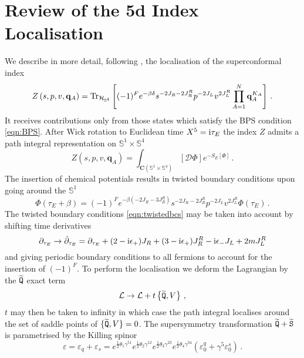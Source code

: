 \documentclass[main.tex]{subfiles}
\begin{document}
\section{Review of the 5d Index Localisation}\label{app:SCIrev}
We describe in more detail, following \cite{Kim:2012gu}, the localisation of the superconformal index
\begin{equation}
Z\left(s,p,v,\mathbf{q}_A\right)=\operatorname{Tr}_{\mathcal{H}_{\mathbb{S}^4}}\left[(-1)^Fe^{-\beta\delta}s^{-2J_R-2J_R^R}p^{-2J_L}v^{2J_L^R}\prod_{A=1}^N\mathbf{q}_A^{K_A}\right]\,.
\end{equation}
It receives contributions only from those states which satisfy the BPS condition \eqref{eqn:BPS}. After Wick rotation to Euclidean time $X^5=\mathrm{i} \tau_E$ the index $Z$ admits a path integral representation on $\mathbb{S}^1\times \mathbb{S}^4$ 
\begin{equation}
Z(s,p,v,\mathbf{q}_A)=\int_{\mathbf{C}(\mathbb{S}^1\times \mathbb{S}^4)}[\mathcal{D}\Phi]e^{-S_{E}[\Phi]}\,.
\end{equation}
The insertion of chemical potentials results in twisted boundary conditions upon going around the $\mathbb{S}^1$
\begin{equation}\label{eqn:twistedbcs}
\Phi(\tau_E+\beta)=(-1)^Fe^{-\beta(-2J_R-3J_R^R)}s^{-2J_R-2J_R^R}p^{-2J_L}v^{2J_L^R}\Phi(\tau_E)\,.
\end{equation}
The twisted boundary conditions \eqref{eqn:twistedbcs} may be taken into account by shifting time derivatives
\begin{equation}\label{eqn:dhat}
\partial_{\tau_E}\to\hat{\partial}_{\tau_E}=\partial_{\tau_E}+(2-\mathrm{i}\epsilon_+)J_R+(3-\mathrm{i}\epsilon_+)J_R^R-\mathrm{i}\epsilon_-J_L+2mJ_L^R
\end{equation}
and giving periodic boundary conditions to all fermions to account for the insertion of $(-1)^F$. 
To perform the localisation we deform the Lagrangian by the $\widetilde{\mathtt{Q}}$ exact term 
\begin{equation}
\mathcal{L}\to\mathcal{L}+t\left\{\widetilde{\mathtt{Q}},V\right\}\,,
\end{equation}
$t$ may then be taken to infinity in which case the path integral localises around the set of saddle points of $\{\widetilde{\mathtt{Q}},V\}=0$. The supersymmetry transformation $\widetilde{\mathtt{Q}}+\widetilde{\mathtt{S}}$ is parametrised by the Killing spinor  
\begin{equation}
\varepsilon=\varepsilon_q+\varepsilon_s=e^{\frac{1}{2}\theta_1\gamma^{51}}e^{\frac{1}{2}\theta_2\gamma^{12}}e^{\frac{1}{2}\theta_3\gamma^{23}}e^{\frac{1}{2}\theta_4\gamma^{34}}\left(\varepsilon_0^q+\gamma^5\varepsilon_0^s\right)\,.
\end{equation}
\end{document}
